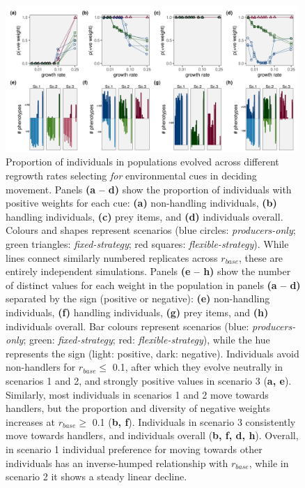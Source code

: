 \documentclass[11pt]{article}
\begin{document}
\begin{figure}[h]
    \centering
    \includegraphics[width=0.99\textwidth]{figures/fig_03_move_weight_end_vals.png}
    \caption{
        Proportion of individuals in populations evolved across different regrowth rates selecting \textit{for} environmental cues in deciding movement.
        Panels \textbf{(a -- d)} show the proportion of individuals with positive weights for each cue: \textbf{(a)} non-handling individuals, \textbf{(b)} handling individuals, \textbf{(c)} prey items, and \textbf{(d)} individuals overall.
        Colours and shapes represent scenarios (blue circles: \textit{producers-only}; green triangles: \textit{fixed-strategy}; red squares: \textit{flexible-strategy}).
        While lines connect similarly numbered replicates across $r_{base}$, these are entirely independent simulations.
        Panels \textbf{(e -- h)} show the number of distinct values for each weight in the population in panels \textbf{(a -- d)} separated by the sign (positive or negative): \textbf{(e)} non-handling individuals, \textbf{(f)} handling individuals, \textbf{(g)} prey items, and \textbf{(h)} individuals overall.
        Bar colours represent scenarios (blue: \textit{producers-only}; green: \textit{fixed-strategy}; red: \textit{flexible-strategy}), while the hue represents the sign (light: positive, dark: negative).
        Individuals avoid non-handlers for $r_{base} \leq$ 0.1, after which they evolve neutrally in scenarios 1 and 2, and strongly positive values in scenario 3  (\textbf{a, e}).
        Similarly, most individuals in scenarios 1 and 2 move towards handlers, but the proportion and diversity of negative weights increases at $r_{base} \geq$ 0.1 (\textbf{b, f}). Individuals in scenario 3 consistently move towards handlers, and individuals overall (\textbf{b, f, d, h}).
        Overall, in scenario 1 individual preference for moving towards other individuals has an inverse-humped relationship with $r_{base}$, while in scenario 2 it shows a steady linear decline.
    }
    \label{fig:figure_pipeline}
\end{figure}
\end{document}
